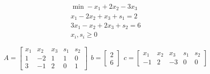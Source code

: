 \Es
\begin{gather*}
\min -x_{1} +2x_{2} -3x_{3}\\
x_{1} -2x_{2} +x_{3} +s_{1} =2\\
3x_{1} -x_{2} +2x_{3} +s_{2} =6\\
x_{i} ,s_{i} \geq 0
\end{gather*}

\begin{equation*}
A=\begin{bmatrix}
x_{1} & x_{2} & x_{3} & s_{1} & s_{2}\\
1 & -2 & 1 & 1 & 0\\
3 & -1 & 2 & 0 & 1
\end{bmatrix} \ \ b=\begin{bmatrix}
2\\
6
\end{bmatrix} \ \ c=\begin{bmatrix}
x_{1} & x_{2} & x_{3} & s_{1} & s_{2}\\
-1 & 2 & -3 & 0 & 0
\end{bmatrix}
\end{equation*}

